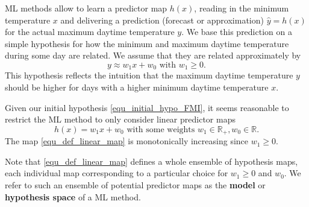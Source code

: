 \documentclass[12pt]{report}
\begin{document}
ML methods allow to learn a predictor map $h(x)$, reading in 
the minimum temperature $x$ and delivering a prediction (forecast or approximation) 
$\hat{y} = h(x)$ for the actual maximum daytime temperature $y$. 
We base this prediction on a simple hypothesis for how the minimum 
and maximum daytime temperature during some day are related. 
We assume that they are related approximately by 
\begin{equation}
\label{equ_initial_hypo_FMI}
y \approx w_{1} x + w_{0} \mbox{ with } w_{1} \geq 0. 
\end{equation}
This hypothesis reflects the intuition that the maximum daytime temperature 
$y$ should be higher for days with a higher minimum daytime temperature $x$. 

Given our initial hypothesis \eqref{equ_initial_hypo_FMI}, it seems reasonable 
to restrict the ML method to only consider linear predictor maps
\begin{equation} 
\label{equ_def_linear_map}
h(x) = w_{1} x + w_{0} \mbox{ with some weights } w_{1} \in \mathbb{R}_{+},w_{0} \in \mathbb{R}. 
\end{equation}
The map \eqref{equ_def_linear_map} is monotonically increasing since $w_{1}\!\geq\!0$. 

Note that \eqref{equ_def_linear_map} defines a whole ensemble of hypothesis maps, 
each individual map corresponding to a particular choice for $w_{1} \geq 0$ and $w_{0}$. 
We refer to such an ensemble of potential predictor maps as the {\bf model} or 
{\bf hypothesis space} of a ML method. 
\end{document}
